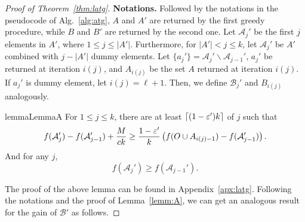 \begin{proof}[Proof of Theorem~\ref{thm:latg}]

\textbf{Notations.}
  Followed by the notations in the pseudocode of Alg.~\ref{alg:atg},
  $A$ and $A'$ are returned by the first greedy procedure,
  while $B$ and $B'$ are returned by the second one.
  Let $\mathcal{A}_j'$ be the first $j$ elements in $A'$,
  where $1 \le j \le |A'|$.
  Furthermore, for $|A'| < j \le k$, 
  let $\mathcal{A}_j'$ be $A'$
  combined with $j-|A'|$ dummy elements.
  Let $\{a_j'\} = \mathcal{A}_j' \backslash \mathcal{A}_{j-1}'$,
  $a_j'$ be returned at iteration $i(j)$,
  and $A_{i(j)}$ be the set $A$ returned at iteration $i(j)$.
  If $a_j'$ is dummy element, let $i(j)=\ell+1$.
  Then, we define $\mathcal{B}_j'$ and $B_{i(j)}$ analogously.
\begin{restatable}{lemma}{LemmaA}
  \label{lemm:A}
  For $1 \le j \le k$, there are at least $\lceil(1-\varepsilon')k\rceil$ of $j$ such that 
    $$f(\mathcal{A}_j')-f(\mathcal{A}_{j-1}')+\frac{M}{ck}\ge 
    \frac{1-\varepsilon'}{k}\left(f(O\cup A_{i(j)-1})-f(\mathcal{A}_{j-1}')\right).$$
    And for any $j$,
    $$f(\mathcal{A}_j')\ge f(\mathcal{A}_{j-1}').$$
\end{restatable}
The proof of the above lemma can be found in Appendix~\ref{apx:latg}.
Following the notations and the proof of Lemma~\ref{lemm:A},
we can get an analogous result
for the gain of $\mathcal B'$ as follows.


\end{proof}
